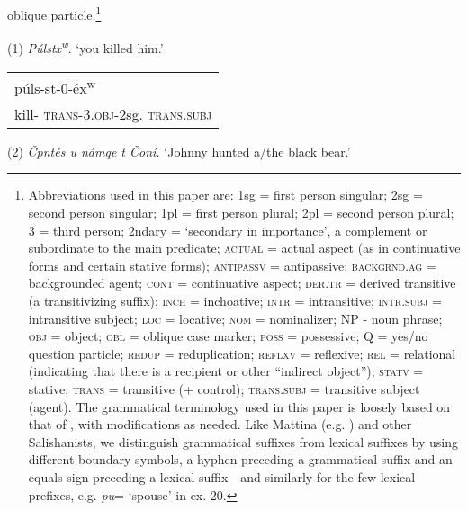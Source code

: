 \documentclass[output=paper,colorlinks,citecolor=brown]{langscibook}
\begin{document}
  oblique particle.\footnote{Abbreviations used in this paper are:
  1sg = first person singular; 2sg = second person singular; 1pl =
  first person plural; 2pl = second person plural; 3 = third person;
  2ndary = `secondary in importance', a complement or subordinate to
  the main predicate; \textsc{actual} = actual aspect (as in
  continuative forms and certain stative forms); \textsc{antipassv} =
  antipassive; \textsc{backgrnd.ag} = backgrounded agent; \textsc{cont} =
  continuative aspect; \textsc{der.tr} = derived transitive (a
  transitivizing suffix); \textsc{inch} = inchoative; \textsc{intr} =
  intransitive; \textsc{intr.subj} = intransitive subject; \textsc{loc} =
  locative; \textsc{nom} = nominalizer; NP - noun phrase; \textsc{obj} =
  object; \textsc{obl} = oblique case marker; \textsc{poss} = possessive; Q
  = yes/no question particle; \textsc{redup} = reduplication; \textsc{     reflxv} = reflexive; \textsc{rel} = relational (indicating that
  there is a recipient or other ``indirect object''); \textsc{statv} =
  stative; \textsc{trans} = transitive (+ control); \textsc{trans.subj} =
  transitive subject (agent).  The grammatical terminology used in
  this paper is loosely based on that of \cite{Carlson:1972}, with
  modifications as needed.  Like Mattina (e.g. \cite{Mattina:1987}) and other
  Salishanists, we distinguish grammatical suffixes from lexical
  suffixes by using different boundary symbols, a hyphen preceding a
  grammatical suffix and an equals sign preceding a lexical
  suffix---and similarly for the few lexical prefixes, e.g. \emph{pu\textglotstop}= `spouse' in ex. 20.}

  \clearpage

\noindent (1) \emph{P\'ulstx\textsuperscript w}. `you killed him.'


\noindent\hspace*{.3in}\parbox[t]{5.5in}{

\begin{tabular}{l}

 p\'uls-st-0-\'ex\textsuperscript w\\
 kill-\textsc{  trans}-3.\textsc{obj}-2sg.\textsc{  trans.subj}\\

\end{tabular}

}

\bigskip

\noindent (2) \emph{\v{C}{\textltilde}pnt\'es {\textltilde}u
 n\textltilde\'amqe t \v{C}on\'i.} `Johnny hunted a/the black bear.'
\end{document}
